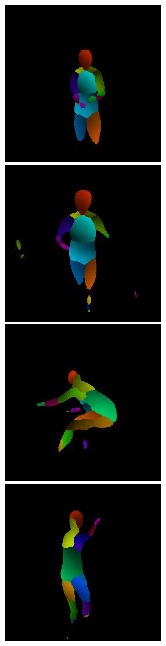 \begin{figure}[t!]
    \hfill
    \includegraphics[height=\flowhh]{Figures/pose/qualitative/view/view_iuv_04}
    \hfill
    \includegraphics[height=\flowhh]{Figures/pose/qualitative/view/view_iuv_06}
    \hfill
    \includegraphics[height=\flowhh]{Figures/pose/qualitative/view/view_iuv_113}
    \hfill
    \includegraphics[height=\flowhh]{Figures/pose/qualitative/view/view_iuv_10}

\end{figure}
